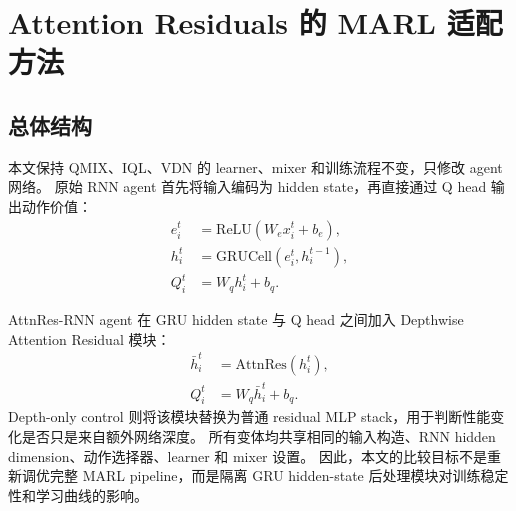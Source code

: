 \section{Attention Residuals 的 MARL 适配方法}

\subsection{总体结构}

本文保持 QMIX、IQL、VDN 的 learner、mixer 和训练流程不变，只修改 agent 网络。
原始 RNN agent 首先将输入编码为 hidden state，再直接通过 Q head 输出动作价值：
\begin{align}
  e_i^t &= \mathrm{ReLU}(W_e x_i^t+b_e), \\
  h_i^t &= \mathrm{GRUCell}(e_i^t,h_i^{t-1}), \\
  Q_i^t &= W_q h_i^t + b_q.
\end{align}

AttnRes-RNN agent 在 GRU hidden state 与 Q head 之间加入 Depthwise Attention Residual 模块：
\begin{align}
  \bar{h}_i^t &= \mathrm{AttnRes}(h_i^t), \\
  Q_i^t &= W_q \bar{h}_i^t + b_q.
\end{align}
Depth-only control 则将该模块替换为普通 residual MLP stack，用于判断性能变化是否只是来自额外网络深度。
所有变体均共享相同的输入构造、RNN hidden dimension、动作选择器、learner 和 mixer 设置。
因此，本文的比较目标不是重新调优完整 MARL pipeline，而是隔离 GRU hidden-state 后处理模块对训练稳定性和学习曲线的影响。

